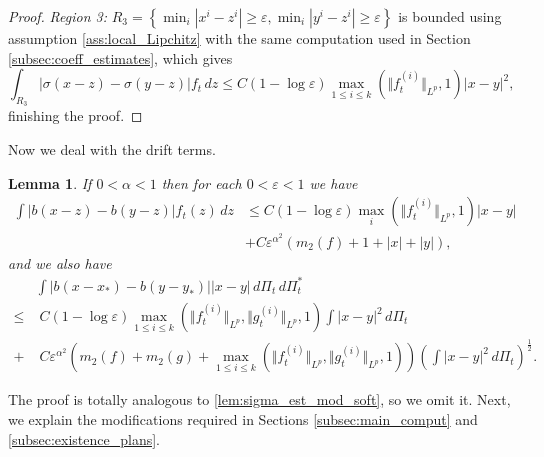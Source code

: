 \documentclass[10pt,oneside]{amsart}
\numberwithin{equation}{section}
\numberwithin{definition}{section}
\numberwithin{theorem}{section}
\newtheorem{lemma}{Lemma}
\numberwithin{lemma}{section}
\begin{document}
\begin{proof}
  \textit{Region 3:} $R_{3}=\left\{ \min_{i}|x^{i}-z^{i}|\geq\varepsilon,\min_{i}|y^{i}-z^{i}|\geq\varepsilon\right\}$ is bounded using assumption \ref{ass:local_Lipchitz} with the same computation used in Section \ref{subsec:coeff_estimates}, which gives
  \begin{equation*}
    \int_{R_{3}}\left|\sigma(x-z)-\sigma(y-z)\right|f_{t}\,dz\leq C(1-\log\varepsilon)\max_{1\leq i\leq k}(\Vert f_{t}^{(i)}\Vert_{L^{p}},1)|x-y|^{2},
  \end{equation*}
  finishing the proof.
\end{proof}
%
Now we deal with the drift terms.
%
\begin{lemma}\label{lem:b_est_mod_soft}
  If $0<\alpha<1$ then for each $0<\varepsilon<1$ we have
  \begin{align}
    \int\left|b(x-z)-b(y-z)\right|f_{t}(z)\,dz&\label{eq:b_lem_mod_soft1}
    \leq C(1-\log\varepsilon)\max_{i}(\Vert f_{t}^{(i)}\Vert_{L^{p}},1)|x-y|\\
    &+C\varepsilon^{\alpha^{2}}\left(m_{2}(f)+1+|x|+|y|\right),\nonumber
  \end{align}
  and we also have
  \begin{align}
    & \int\left|b(x-x_{*})-b(y-y_{*})\right||x-y|\,d\Pi_{t}\,d\Pi_{t}^{*}\label{eq:b_lem_mod_soft2}\\ 
    \leq & \; C(1-\log\varepsilon)\max_{1\leq i\leq k}(\Vert f_{t}^{(i)}\Vert_{L^{p}},\Vert g_{t}^{(i)}\Vert_{L^{p}},1)\int|x-y|^{2}\,d\Pi_{t}\nonumber	\\
    +&\; C\varepsilon^{\alpha^{2}}\left(m_{2}(f)+m_{2}(g)+\max_{1\leq i\leq k}(\Vert f_{t}^{(i)}\Vert_{L^{p}},\Vert g_{t}^{(i)}\Vert_{L^{p}},1)\right)\left(\int|x-y|^{2}\,d\Pi_{t}\right)^{\frac{1}{2}}.\nonumber
  \end{align}
\end{lemma}
% 
The proof is totally analogous to \cref{lem:sigma_est_mod_soft}, so we omit it. Next, we explain the modifications required in Sections \ref{subsec:main_comput} and \ref{subsec:existence_plans}.
\end{document}
